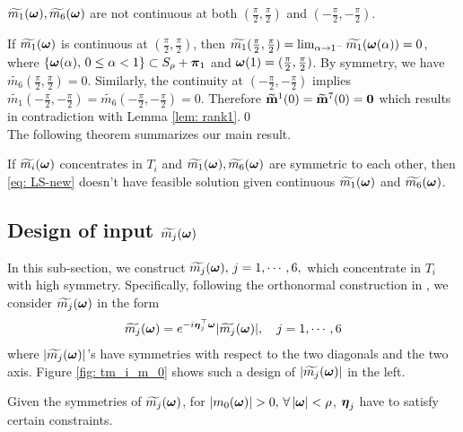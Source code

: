 \begin{proposition}
$\widetilde{m_{1}}(\boldsymbol{\omega}),\widetilde{m_{6}}(\boldsymbol{\omega})$ are not continuous at both $(\frac{\pi}{2},\frac{\pi}{2})$ and $(-\frac{\pi}{2},-\frac{\pi}{2})$.
\end{proposition}
If $\widetilde{m_{1}}(\boldsymbol{\omega})$ is continuous at $(\frac{\pi}{2},\frac{\pi}{2})$, then $\widetilde{m_1}(\frac{\pi}{2},\frac{\pi}{2}) = \lim_{\alpha\rightarrow 1^-}\widetilde{m_1}(\boldsymbol{\omega}(\alpha)) = 0$, where $\{\boldsymbol{\omega}(\alpha),\,0\leq \alpha<1\} \subset S_\rho + \boldsymbol{\pi}_1$ and $\boldsymbol{\omega}(1) = (\frac{\pi}{2},\frac{\pi}{2})$. By symmetry, we have $\widetilde{m_6}(\frac{\pi}{2},\frac{\pi}{2}) = 0$. Similarly, the continuity at $(-\frac{\pi}{2},-\frac{\pi}{2})$ implies $\widetilde{m_1}(-\frac{\pi}{2},-\frac{\pi}{2}) = \widetilde{m_6}(-\frac{\pi}{2},-\frac{\pi}{2}) = 0$. Therefore $\widetilde{\mathbf{m}}^{1}(0) = \widetilde{\mathbf{m}}^{7}(0) = \mathbf{0}$ which results in contradiction with Lemma \ref{lem: rank1}.\qed\\[1em]%
The following theorem summarizes our main result.
\begin{theorem}\label{thm: thm}
If  $\widetilde{m_{i}}(\boldsymbol{\omega})$ concentrates in $T_i$ and $\widetilde{m_{1}}(\boldsymbol{\omega}),\widetilde{m_{6}}(\boldsymbol{\omega})$ are symmetric to each other,  then  \eqref{eq: LS-new} doesn't have feasible solution given continuous $\widetilde{m_{1}}(\boldsymbol{\omega})$ and $\widetilde{m_{6}}(\boldsymbol{\omega})$.
\end{theorem}

\subsection{Design of input $\widetilde{m_{j}}(\boldsymbol{\omega})$}\label{sec: phase-design}
In this sub-section, we construct $\widetilde{m_{j}}(\boldsymbol{\omega}),\, j = 1,\cdots,6,$ which concentrate in $T_i$ with high symmetry.
Specifically, following the orthonormal construction in \cite{yin2014orthshear}, we consider $\widetilde{m_{j}}(\boldsymbol{\omega})$ in the form 
\begin{align}\label{eq: m-form}
\widetilde{m_{j}}(\boldsymbol{\omega}) = e^{-i\boldsymbol{\eta}_j^\top\boldsymbol{\omega}}|\widetilde{m_{j}}(\boldsymbol{\omega})|,\quad j = 1,\cdots,6
\end{align}
 where $|\widetilde{m_{j}}(\boldsymbol{\omega})|$'s have symmetries with respect to the two diagonals and the two axis. Figure \ref{fig: tm_i_m_0} shows such a design of $|\widetilde{m_{j}}(\boldsymbol{\omega})|$ in the left.
 
Given the symmetries of $\widetilde{m_{j}}(\boldsymbol{\omega})$, for $|m_0(\boldsymbol{\omega})| > 0,\, \forall\, |\boldsymbol{\omega}| < \rho$, $\boldsymbol{\eta}_j$ have to satisfy certain constraints.
 
